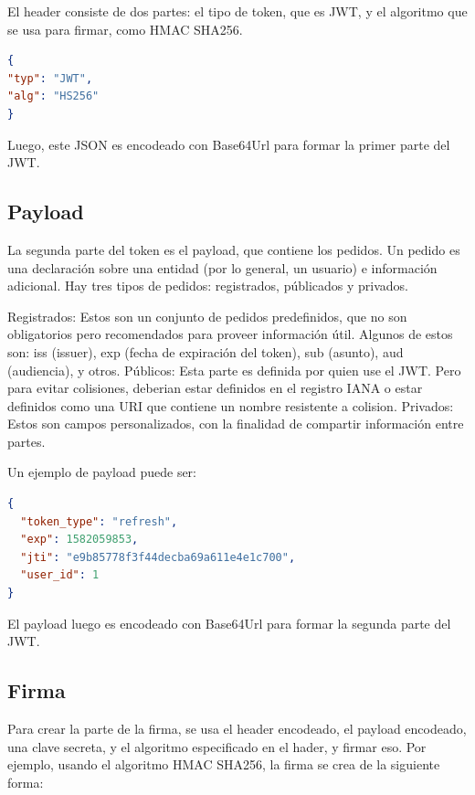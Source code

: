 El header consiste de dos partes: el tipo de token, que es JWT, y el algoritmo que se usa para firmar, como HMAC SHA256.

\begin{lstlisting}[language=json,firstnumber=1]
{
"typ": "JWT",
"alg": "HS256"
}
\end{lstlisting}
Luego, este JSON es encodeado con Base64Url para formar la primer parte del JWT.

\subsection[Payload]{Payload}

La segunda parte del token es el payload, que contiene los pedidos. Un pedido es una declaración sobre una entidad (por lo general, un usuario) e información adicional. Hay tres tipos de pedidos: registrados, públicados y privados.

\begin{outline}
    \1 Registrados: Estos son un conjunto de pedidos predefinidos, que no son obligatorios pero recomendados para proveer información útil. Algunos de estos son: iss (issuer), exp (fecha de expiración del token), sub (asunto), aud (audiencia), y otros.
    \1 Públicos: Esta parte es definida por quien use el JWT. Pero para evitar colisiones, deberian estar definidos en el registro IANA o estar definidos como una URI que contiene un nombre resistente a colision.
    \1 Privados: Estos son campos personalizados, con la finalidad de compartir información entre partes.
\end{outline}

Un ejemplo de payload puede ser: 

\begin{lstlisting}[language=json,firstnumber=1]
{
  "token_type": "refresh",
  "exp": 1582059853,
  "jti": "e9b85778f3f44decba69a611e4e1c700",
  "user_id": 1
}
\end{lstlisting}

El payload luego es encodeado con Base64Url para formar la segunda parte del JWT.

\subsection[Firma]{Firma}

Para crear la parte de la firma, se usa el header encodeado, el payload encodeado, una clave secreta, y el algoritmo especificado en el hader, y firmar eso.
Por ejemplo, usando el algoritmo HMAC SHA256, la firma se crea de la siguiente forma: 

